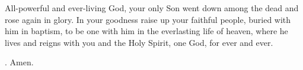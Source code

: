 \lettrine[lines=3]{A}{}ll-powerful and ever-living God,
your only Son went down among the dead
and rose again in glory.
In your goodness
raise up your faithful people,
buried with him in baptism,
to be one with him
in the everlasting life of heaven,
where he lives and reigns with you and the Holy Spirit,
one God, for ever and ever. \par \Rbar. Amen.